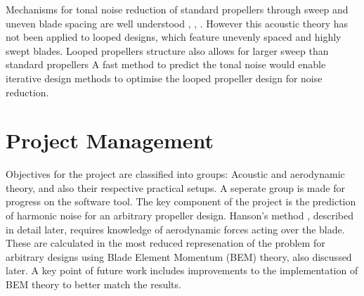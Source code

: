 \documentclass{article}
\begin{document}
Mechanisms for tonal noise reduction of standard propellers through sweep and uneven blade spacing are well understood \cite{hanson_influence}, \cite{DOBRZYNSKI1993123}, \cite{doi:10.2514/3.22938}.
However this acoustic theory has not been applied to looped designs, which feature unevenly spaced and highly swept blades.
Looped propellers structure also allows for larger sweep than standard propellers \cite{shima_toroidal}
A fast method to predict the tonal noise would enable iterative design methods to optimise the looped propeller design for noise reduction.

\section{Project Management}

Objectives for the project are classified into groups: Acoustic and aerodynamic theory, and also their respective practical setups. 
A seperate group is made for progress on the software tool.
The key component of the project is the prediction of harmonic noise for an arbitrary propeller design.
Hanson's method \cite{hanson_theory}, described in detail later, requires knowledge of aerodynamic forces acting over the blade.
These are calculated in the most reduced represenation of the problem for arbitrary designs using Blade Element Momentum (BEM) theory, also discussed later.
A key point of future work includes improvements to the implementation of BEM theory to better match the results.
% 
\end{document}
